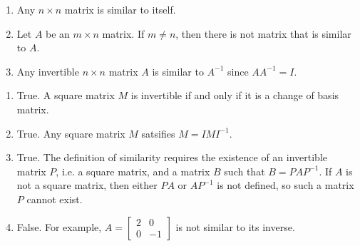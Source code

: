\begin{exercises}
\begin{problist}
\begin{enumerate}
			\item Any $n \times n$ matrix is similar to itself.

			\item Let $A$ be an $m \times n$ matrix. If $m
				\neq n$, then there is not matrix that is
				similar to $A$.

			\item Any invertible $n \times n$ matrix $A$ is similar to
				$A^{-1}$ since $AA^{-1}=I$.
		\end{enumerate}
		\begin{solution}
			\begin{enumerate}
				\item True. A square matrix $M$ is invertible if and only if it is a change of basis matrix.
				\item True. Any square matrix $M$ satsifies $M=IMI^{-1}$.
				\item True. The definition of similarity requires the existence of an invertible matrix $P$,
					i.e. a square matrix, and a matrix $B$ such that $B=PAP^{-1}$. If $A$ is not a square matrix,
					then either $PA$ or $AP^{-1}$ is not defined, so such a matrix $P$ cannot exist.
				\item False. For example, 
				$A=\begin{bmatrix}
					2 & 0 \\ 0 & -1
				\end{bmatrix}$
				is not similar to its inverse.
			\end{enumerate}
		\end{solution}
	\end{problist}
\end{exercises}
